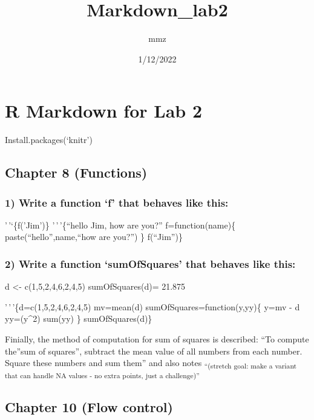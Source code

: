 \documentclass[
]{article}
\title{Markdown\_lab2}
\author{mmz}
\date{1/12/2022}
\begin{document}
\maketitle

\hypertarget{r-markdown-for-lab-2}{%
\section{R Markdown for Lab 2}\label{r-markdown-for-lab-2}}

Install.packages(`knitr')

\hypertarget{chapter-8-functions}{%
\subsection{Chapter 8 (Functions)}\label{chapter-8-functions}}

\hypertarget{write-a-function-f-that-behaves-like-this}{%
\subsubsection{1) Write a function `f' that behaves like
this:}\label{write-a-function-f-that-behaves-like-this}}

'\,'`\{f('Jim')\} '\,'\,'\{``hello Jim, how are you?''
f=function(name)\{ paste(``hello'',name,``how are you?'') \}
f(``Jim'')\}

\hypertarget{write-a-function-sumofsquares-that-behaves-like-this}{%
\subsubsection{2) Write a function `sumOfSquares' that behaves like
this:}\label{write-a-function-sumofsquares-that-behaves-like-this}}

d \textless- c(1,5,2,4,6,2,4,5) sumOfSquares(d)= 21.875

'\,'\,'\{d=c(1,5,2,4,6,2,4,5) mv=mean(d) sumOfSquares=function(y,yy)\{
y=mv - d yy=(y\^{}2) sum(yy) \} sumOfSquares(d)\}

Finially, the method of computation for sum of squares is described:
``To compute the''sum of squares'', subtract the mean value of all
numbers from each number. Square these numbers and sum them'' and also
notes \textsubscript{``(stretch goal: make a variant that can handle NA
values - no extra points, just a challenge)''}

\hypertarget{chapter-10-flow-control}{%
\subsection{Chapter 10 (Flow control)}\label{chapter-10-flow-control}}
\end{document}
